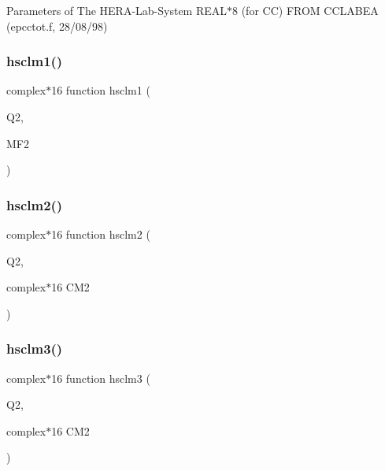Parameters of The H\+E\+R\+A-\/\+Lab-\/\+System R\+E\+A\+L$\ast$8 (for CC) F\+R\+OM C\+C\+L\+A\+B\+EA (epcctot.\+f, 28/08/98) 

\mbox{\label{djangoh__h_8f_aa73a3da66e3805e1c582500aa571bb24}} 
\subsubsection{\texorpdfstring{hsclm1()}{hsclm1()}}
{\footnotesize\ttfamily complex$\ast$16 function hsclm1 (\begin{DoxyParamCaption}\item[{}]{Q2,  }\item[{}]{M\+F2 }\end{DoxyParamCaption})}

\mbox{\label{djangoh__h_8f_a9191e08bf7b1e7691309c6944bc34528}} 
\subsubsection{\texorpdfstring{hsclm2()}{hsclm2()}}
{\footnotesize\ttfamily complex$\ast$16 function hsclm2 (\begin{DoxyParamCaption}\item[{}]{Q2,  }\item[{complex$\ast$16}]{C\+M2 }\end{DoxyParamCaption})}

\mbox{\label{djangoh__h_8f_a720a93e4f8ea99c1f2266cbbefc41cce}} 
\subsubsection{\texorpdfstring{hsclm3()}{hsclm3()}}
{\footnotesize\ttfamily complex$\ast$16 function hsclm3 (\begin{DoxyParamCaption}\item[{}]{Q2,  }\item[{complex$\ast$16}]{C\+M2 }\end{DoxyParamCaption})}

